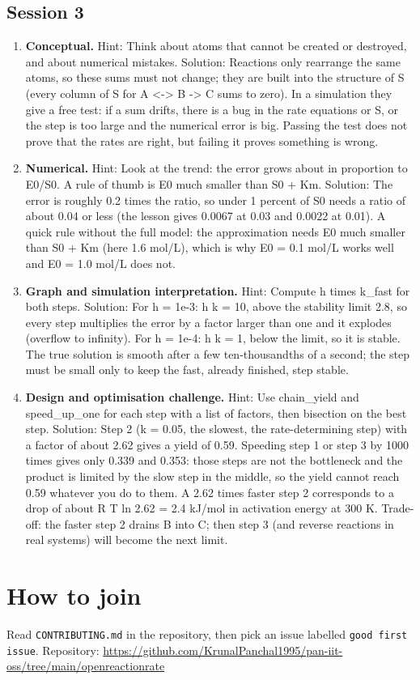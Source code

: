 \documentclass[11pt,a4paper]{article}
\begin{document}
\subsection*{Session 3}
\begin{enumerate}[nosep]
\item \textbf{Conceptual.} Hint: Think about atoms that cannot be created or destroyed, and about numerical mistakes. Solution: Reactions only rearrange the same atoms, so these sums must not change; they are built into the structure of S (every column of S for A \textless{}-\textgreater{} B -\textgreater{} C sums to zero). In a simulation they give a free test: if a sum drifts, there is a bug in the rate equations or S, or the step is too large and the numerical error is big. Passing the test does not prove that the rates are right, but failing it proves something is wrong.
\item \textbf{Numerical.} Hint: Look at the trend: the error grows about in proportion to E0/S0. A rule of thumb is E0 much smaller than S0 + Km. Solution: The error is roughly 0.2 times the ratio, so under 1 percent of S0 needs a ratio of about 0.04 or less (the lesson gives 0.0067 at 0.03 and 0.0022 at 0.01). A quick rule without the full model: the approximation needs E0 much smaller than S0 + Km (here 1.6 mol/L), which is why E0 = 0.1 mol/L works well and E0 = 1.0 mol/L does not.
\item \textbf{Graph and simulation interpretation.} Hint: Compute h times k\_fast for both steps. Solution: For h = 1e-3: h k = 10, above the stability limit 2.8, so every step multiplies the error by a factor larger than one and it explodes (overflow to infinity). For h = 1e-4: h k = 1, below the limit, so it is stable. The true solution is smooth after a few ten-thousandths of a second; the step must be small only to keep the fast, already finished, step stable.
\item \textbf{Design and optimisation challenge.} Hint: Use chain\_yield and speed\_up\_one for each step with a list of factors, then bisection on the best step. Solution: Step 2 (k = 0.05, the slowest, the rate-determining step) with a factor of about 2.62 gives a yield of 0.59. Speeding step 1 or step 3 by 1000 times gives only 0.339 and 0.353: those steps are not the bottleneck and the product is limited by the slow step in the middle, so the yield cannot reach 0.59 whatever you do to them. A 2.62 times faster step 2 corresponds to a drop of about R T ln 2.62 = 2.4 kJ/mol in activation energy at 300 K. Trade-off: the faster step 2 drains B into C; then step 3 (and reverse reactions in real systems) will become the next limit.
\end{enumerate}

\section{How to join}
Read \texttt{CONTRIBUTING.md} in the repository, then pick an issue labelled \texttt{good first issue}. Repository: \url{https://github.com/KrunalPanchal1995/pan-iit-oss/tree/main/openreactionrate}
\end{document}
